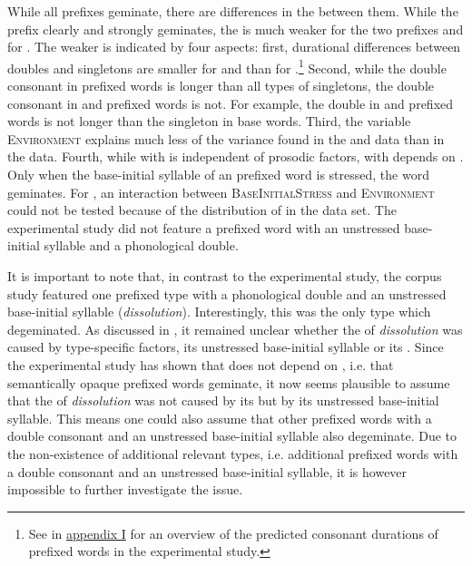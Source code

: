 While all prefixes geminate, there are differences in the  between them. While the prefix  clearly and strongly geminates, the  is much weaker for the two prefixes and for . The weaker  is indicated by four aspects: first, durational differences between doubles and singletons are smaller for  and  than for .\footnote{See  in \hyperref[Appendix I: Predicted Durations Experiment]{appendix I} for an overview of the predicted consonant durations of prefixed words in the experimental study.} Second, while the double consonant in prefixed words is longer than all types of singletons, the double consonant in  and prefixed words is not. For example, the double in  and prefixed words is not longer than the singleton in base words. Third, the variable \textsc{Environment} explains much less of the variance found in the  and data than in the data. 
Fourth, while  with  is independent of prosodic factors,  with  depends on . Only when the base-initial syllable of an prefixed word is stressed, the word geminates. For , an interaction between \textsc{BaseInitialStress} and \textsc{Environment} could not be tested because of the distribution of  in the data set. The experimental study did not feature a prefixed word with an unstressed base-initial syllable and a phonological double.

It is important to note that, in contrast to the experimental study, the corpus study featured one prefixed type with a phonological double and an unstressed base-initial syllable (\textit{dissolution}). Interestingly, this was the only type which degeminated. As discussed in , it remained unclear whether the  of \textit{dissolution} was caused by type-specific factors, its unstressed base-initial syllable or its .
Since the experimental study has shown that  does not depend on , i.e. that semantically opaque prefixed words geminate,  it now seems plausible to assume that the  of \textit{dissolution} was not  caused by its  but by its unstressed base-initial syllable. This means one could also assume that other prefixed words with a double consonant and an unstressed base-initial syllable also degeminate. Due to the non-existence of additional relevant types, i.e. additional prefixed words with a double consonant and an unstressed base-initial syllable, it is however impossible to further investigate the issue. 




